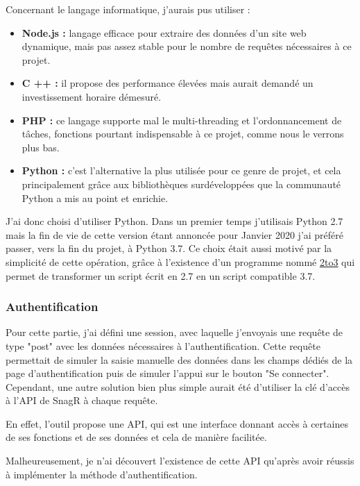 Concernant le langage informatique, j'aurais pus utiliser :
\begin{itemize}
\item \textbf{Node.js :} langage efficace pour extraire des données d'un site web dynamique, mais pas assez stable pour le nombre de requêtes nécessaires à ce projet.
\item \textbf{C ++ :} il propose des performance élevées mais aurait demandé un investissement horaire démesuré.
\item \textbf{PHP :} ce langage supporte mal le multi-threading et l'ordonnancement de tâches, fonctions pourtant indispensable à ce projet, comme nous le verrons plus bas.
\item \textbf{Python :} c'est l'alternative la plus utilisée pour ce genre de projet, et cela principalement grâce aux bibliothèques surdéveloppées que la communauté Python a mis au point et enrichie.
\end{itemize}

J'ai donc choisi d'utiliser Python. Dans un premier temps j'utilisais Python 2.7 mais la fin de vie de cette version étant annoncée pour Janvier 2020 j'ai préféré passer, vers la fin du projet, à Python 3.7.
Ce choix était aussi motivé par la simplicité de cette opération, grâce à l'existence d'un programme nommé \underline{\href{https://docs.python.org/2/library/2to3.html}{2to3}} qui permet de transformer un script écrit en 2.7 en un script compatible 3.7.

\subsubsection{Authentification}

Pour cette partie, j'ai défini une session, avec laquelle j'envoyais une requête de type "post" avec les données nécessaires à l'authentification. Cette requête permettait de simuler la saisie manuelle des données dans les champs dédiés de la page d'authentification puis de simuler l'appui sur le bouton "Se connecter".
Cependant, une autre solution bien plus simple aurait été d'utiliser la clé d'accès à l'\gls{API} de \gls{SnagR} à chaque requête.

En effet, l'outil propose une \gls{API}, qui est une interface donnant accès à certaines de ses fonctions et de ses données et cela de manière facilitée.

Malheureusement, je n'ai découvert l'existence de cette \gls{API} qu'après avoir réussis à implémenter la méthode d'authentification.

